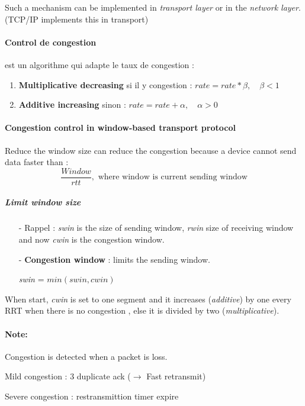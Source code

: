 Such a mechanism can be implemented in \textit{transport layer} or in the \textit{network
layer}. (TCP/IP implements this in transport)

\paragraph{Control de congestion} est un algorithme qui adapte le taux de congestion :
\begin{enumerate}
    \item \textbf{Multiplicative decreasing} si il y congestion : $rate =  rate*\beta, \quad \beta <1$
    \item \textbf{Additive increasing} sinon :  $rate =  rate + \alpha, \quad \alpha>0$
\end{enumerate}

\paragraph{Congestion control in window-based transport protocol}
Reduce the window size can reduce the congestion because a device cannot
send data faster than : $$\frac{Window}{rtt}, \textrm{ where window is current sending window} $$

\subparagraph{Limit window size}
\begin{itemize}
    \item[-] Rappel : \textit{swin} is the size of sending window, \textit{rwin} size
        of receiving window and now \textit{cwin} is the congestion window.
    \item[-] \textbf{Congestion window} : limits the sending window. 

        \textit{swin} = $min( swin, cwin )$
\end{itemize}

When start, \textit{cwin} is set to one segment and it increases (\textit{additive}) by one every RRT when there is no congestion , else it is divided by two (\textit{multiplicative}).

\paragraph{Note: }
\begin{description}
    \item Congestion is detected when a packet is loss.
    \item Mild congestion : 3 duplicate ack ($\to$ Fast retransmit)
    \item Severe congestion : restransmittion timer expire
        \end{description}

